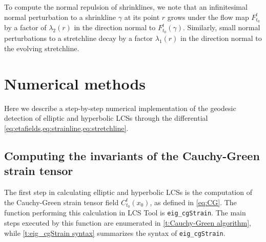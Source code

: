 \documentclass{elsarticle}
\begin{document}
To compute the normal repulsion of shrinklines, we note that an infinitesimal
normal perturbation to a shrinkline $\gamma$ at its point $r$ grows under the flow map $F_{t_{0}}^{t}$ by a factor of $\lambda_{2}(r)$ in the direction normal to $F_{t_{0}}^{t}(\gamma).$ Similarly, small normal perturbations to a stretchline decay by a factor $\lambda_{1}(r)$ in the direction normal to the evolving stretchline. 

\section{Numerical methods}

Here we describe a step-by-step numerical implementation of the geodesic detection of elliptic and hyperbolic LCSs through the differential \cref{eq:etafields,eq:strainline,eq:stretchline}.


\subsection{Computing the invariants of the Cauchy-Green strain tensor}

The first step in calculating elliptic and hyperbolic LCSs is the computation of the Cauchy-Green strain tensor field $C_{t_0}^t(x_0)$, as defined in \cref{eq:CG}. The function performing this calculation in LCS Tool is \lstinline!eig_cgStrain!. The main steps executed by this function are enumerated in \cref{t:Cauchy-Green algorithm}, while \cref{t:eig_cgStrain syntax} summarizes the syntax of \lstinline!eig_cgStrain!.
\end{document}
